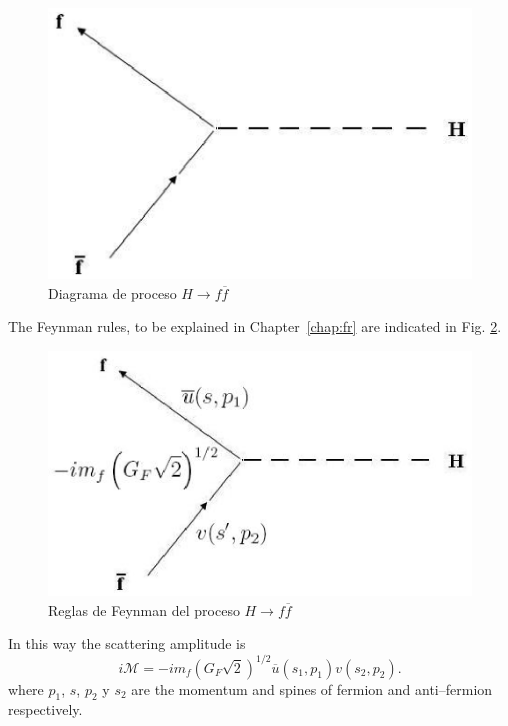 \begin{figure}[h!] %
\begin{center} %
\includegraphics[scale=0.5]{decay}%
\caption{Diagrama de proceso $H\to f\overline{f}$} %
\label{fig:a} %
\end{center} %
\end{figure} %

The Feynman rules, to be explained in Chapter~\ref{chap:fr} are indicated in Fig. 
\ref{fig:b}. %

\begin{figure}[h] %
\begin{center} %
\includegraphics[scale=0.65]{feyn}%
\caption{Reglas de Feynman del proceso $H\to f\overline{f}$}%
\label{fig:b} %
\end{center} %
\end{figure} %

In this way the scattering amplitude is 
\begin{equation}
i\mathcal{M}=-im_{f}\left(G_{F}\sqrt{2}\right)^{1/2}\overline{u}(s_1,
p_{1})v(s_2, p_{2}). 
\end{equation}
where $p_{1}$, $s$,  $p_{2}$ y $s_2$ are the momentum and spines of fermion and anti--fermion respectively.

